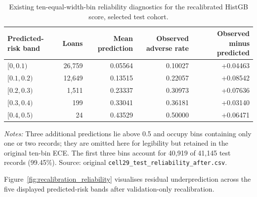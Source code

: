 \documentclass[10pt]{article}
\begin{document}
\begin{table}[!ht]
\centering
\caption{Existing ten-equal-width-bin reliability diagnostics for the recalibrated HistGB score, selected test cohort.}
\label{tab:r2_reliability_bins}
\begin{tabular}{lrrrr}
\toprule
Predicted-risk band & Loans & Mean prediction & Observed adverse rate & Observed minus predicted \\
\midrule
$[0,0.1)$ & 26,759 & 0.05564 & 0.10027 & +0.04463 \\
$[0.1,0.2)$ & 12,649 & 0.13515 & 0.22057 & +0.08542 \\
$[0.2,0.3)$ & 1,511 & 0.23337 & 0.30973 & +0.07636 \\
$[0.3,0.4)$ & 199 & 0.33041 & 0.36181 & +0.03140 \\
$[0.4,0.5)$ & 24 & 0.43529 & 0.50000 & +0.06471 \\
\bottomrule
\end{tabular}
\par\vspace{2pt}
{\footnotesize \textit{Notes:} Three additional predictions lie above 0.5 and occupy bins containing only one or two records; they are omitted here for legibility but retained in the original ten-bin ECE. The first three bins account for 40,919 of 41,145 test records (99.45\%). Source: original \texttt{cell29\_test\_reliability\_after.csv}.}
\end{table}


Figure~\ref{fig:recalibration_reliability} visualises residual underprediction across the five displayed predicted-risk bands after validation-only recalibration.
\end{document}

